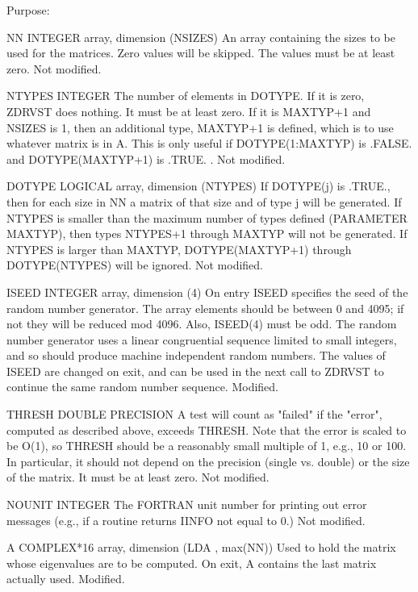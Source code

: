 \begin{DoxyParagraph}{Purpose\+: }
\begin{DoxyVerb}
  NN      INTEGER array, dimension (NSIZES)
          An array containing the sizes to be used for the matrices.
          Zero values will be skipped.  The values must be at least
          zero.
          Not modified.

  NTYPES  INTEGER
          The number of elements in DOTYPE.   If it is zero, ZDRVST
          does nothing.  It must be at least zero.  If it is MAXTYP+1
          and NSIZES is 1, then an additional type, MAXTYP+1 is
          defined, which is to use whatever matrix is in A.  This
          is only useful if DOTYPE(1:MAXTYP) is .FALSE. and
          DOTYPE(MAXTYP+1) is .TRUE. .
          Not modified.

  DOTYPE  LOGICAL array, dimension (NTYPES)
          If DOTYPE(j) is .TRUE., then for each size in NN a
          matrix of that size and of type j will be generated.
          If NTYPES is smaller than the maximum number of types
          defined (PARAMETER MAXTYP), then types NTYPES+1 through
          MAXTYP will not be generated.  If NTYPES is larger
          than MAXTYP, DOTYPE(MAXTYP+1) through DOTYPE(NTYPES)
          will be ignored.
          Not modified.

  ISEED   INTEGER array, dimension (4)
          On entry ISEED specifies the seed of the random number
          generator. The array elements should be between 0 and 4095;
          if not they will be reduced mod 4096.  Also, ISEED(4) must
          be odd.  The random number generator uses a linear
          congruential sequence limited to small integers, and so
          should produce machine independent random numbers. The
          values of ISEED are changed on exit, and can be used in the
          next call to ZDRVST to continue the same random number
          sequence.
          Modified.

  THRESH  DOUBLE PRECISION
          A test will count as "failed" if the "error", computed as
          described above, exceeds THRESH.  Note that the error
          is scaled to be O(1), so THRESH should be a reasonably
          small multiple of 1, e.g., 10 or 100.  In particular,
          it should not depend on the precision (single vs. double)
          or the size of the matrix.  It must be at least zero.
          Not modified.

  NOUNIT  INTEGER
          The FORTRAN unit number for printing out error messages
          (e.g., if a routine returns IINFO not equal to 0.)
          Not modified.

  A       COMPLEX*16 array, dimension (LDA , max(NN))
          Used to hold the matrix whose eigenvalues are to be
          computed.  On exit, A contains the last matrix actually
          used.
          Modified.


\end{DoxyVerb}
\end{DoxyParagraph}
